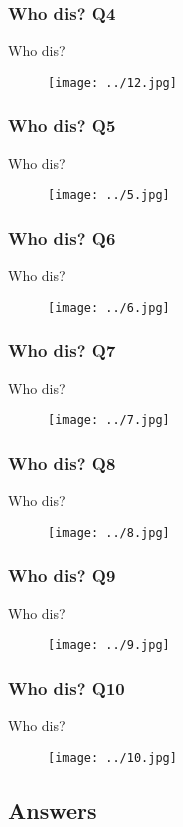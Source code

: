 \documentclass{beamer}
\begin{document}
\begin{frame}
\frametitle{Who dis? Q4}
Who dis?
\begin{figure}
\texttt{[image: ../12.jpg]}
\end{figure}

\end{frame}
\begin{frame}
\frametitle{Who dis? Q5}
Who dis?
\begin{figure}
\texttt{[image: ../5.jpg]}
\end{figure}

\end{frame}

\begin{frame}
\frametitle{Who dis? Q6}
Who dis?
\begin{figure}
\texttt{[image: ../6.jpg]}
\end{figure}

\end{frame}



\begin{frame}
\frametitle{Who dis? Q7}
Who dis?
\begin{figure}
\texttt{[image: ../7.jpg]}
\end{figure}

\end{frame}


\begin{frame}
\frametitle{Who dis? Q8}
Who dis?
\begin{figure}
\texttt{[image: ../8.jpg]}
\end{figure}

\end{frame}

\begin{frame}
\frametitle{Who dis? Q9}
Who dis?
\begin{figure}
\texttt{[image: ../9.jpg]}
\end{figure}

\end{frame}

\begin{frame}
\frametitle{Who dis? Q10}
Who dis?
\begin{figure}
\texttt{[image: ../10.jpg]}
\end{figure}

\end{frame}
\subsection{Answers}
\end{document}
